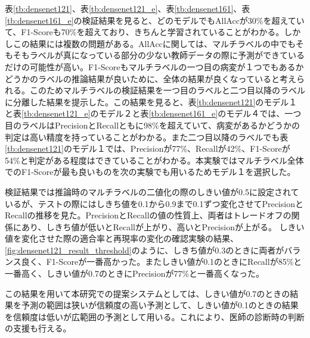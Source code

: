 表\ref{tb:densenet121}、表\ref{tb:densenet121_e}、表\ref{tb:densenet161}、表\ref{tb:densenet161_e}の検証結果を見ると、どのモデルでもAllAccが30\%を超えていて、F1-Scoreも70\%を超えており、きちんと学習されていることがわかる。しかしこの結果には複数の問題がある。AllAccに関しては、マルチラベルの中でもそもそもラベルが真になっている部分の少ない教師データの際に予測ができているだけの可能性が高い。F1-Scoreもマルチラベルの一つ目の病変が１つでもあるかどうかのラベルの推論結果が良いために、全体の結果が良くなっていると考えられる。このためマルチラベルの検証結果を一つ目のラベルと二つ目以降のラベルに分離した結果を提示した。この結果を見ると、表\ref{tb:densenet121}のモデル１と表\ref{tb:densenet121_e}のモデル２と表\ref{tb:densenet161_e}のモデル４では、一つ目のラベルはPrecisionとRecallともに98\%を超えていて、病変があるかどうかの判定は高い精度を持っていることがわかる。また二つ目以降のラベルでも表\ref{tb:densenet121}のモデル１では、Precisionが77\%、Recallが42\%、F1-Scoreが54\%と判定がある程度はできていることがわかる。本実験ではマルチラベル全体でのF1-Scoreが最も良いものを次の実験でも用いるためモデル１を選択した。

検証結果では推論時のマルチラベルの二値化の際のしきい値が0.5に設定されているが、テストの際にはしきち値を0.1から0.9まで0.1ずつ変化させてPrecisionとRecallの推移を見た。PrecisionとRecallの値の性質上、両者はトレードオフの関係にあり、しきち値が低いとRecallが上がり、高いとPrecisionが上がる。
しきい値を変化させた際の適合率と再現率の変化の確認実験の結果、\ref{fig:densenet121_result_threshold}のように、しきち値が0.3のときに両者がバランス良く、F1-Scoreが一番高かった。またしきい値が0.1のときにRecallが85\%と一番高く、しきい値が0.7のときにPrecisionが77\%と一番高くなった。

この結果を用いて本研究での提案システムとしては、しきい値が0.7のときの結果を予測の範囲は狭いが信頼度の高い予測として、しきい値が0.1のときの結果を信頼度は低いが広範囲の予測として用いる。これにより、医師の診断時の判断の支援も行える。

